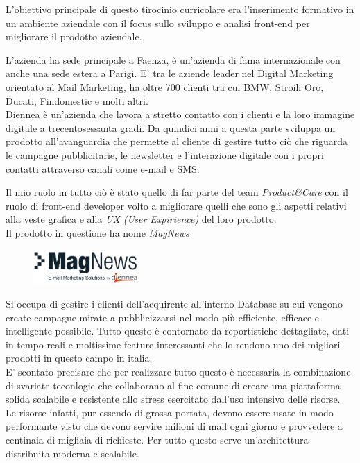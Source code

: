 \documentclass[a4paper]{article}
\begin{document}
\par L'obiettivo principale di questo tirocinio curricolare era l'inserimento formativo
in un ambiente aziendale con il focus sullo sviluppo e analisi front-end per
migliorare il prodotto aziendale.\\
\par L'azienda ha sede principale a Faenza, è un'azienda di fama internazionale con 
anche una sede estera a Parigi. E' tra le aziende leader nel Digital Marketing 
orientato al Mail Marketing, ha oltre 700 clienti tra cui BMW, Stroili Oro,  Ducati,
 Findomestic e molti altri.\\
Diennea è un'azienda che lavora a stretto contatto con i clienti e la loro immagine digitale a 
trecentosessanta gradi. Da quindici anni a questa parte sviluppa un prodotto all'avanguardia
che permette al cliente di gestire tutto ciò che riguarda le campagne pubblicitarie, le newsletter e 
l'interazione digitale con i propri contatti attraverso canali come e-mail e SMS.\\
\par Il mio ruolo in tutto ciò è stato quello di far parte del team \emph{Product\&Care} con il ruolo di 
front-end developer volto a migliorare quelli che sono gli aspetti relativi alla 
veste grafica e alla \emph{UX (User Expirience)} del loro prodotto.\\
Il prodotto in questione ha nome \emph{MagNews}
\begin{figure}[H]
	\includegraphics[width=4cm]{magnews-diennea.png}
	\centering
\end{figure}
Si occupa di gestire i clienti dell'acquirente all'interno Database su cui vengono
create campagne mirate a pubblicizzarsi nel modo più efficiente, efficace e intelligente 
possibile. Tutto questo è contornato da reportistiche dettagliate, dati in tempo reali 
e moltissime feature interessanti che lo rendono uno dei migliori prodotti in questo
campo in italia.\\ 
E' scontato precisare che per realizzare tutto questo è necessaria la combinazione
di svariate teconlogie che collaborano al fine comune di creare una piattaforma solida
scalabile e resistente allo stress esercitato dall'uso intensivo delle risorse.\\
Le risorse infatti, pur essendo di grossa portata, devono essere usate in modo
performante visto che devono servire milioni di mail ogni giorno e provvedere a centinaia
di migliaia di richieste. Per tutto questo serve un'architettura distribuita moderna e scalabile. 
\end{document}
